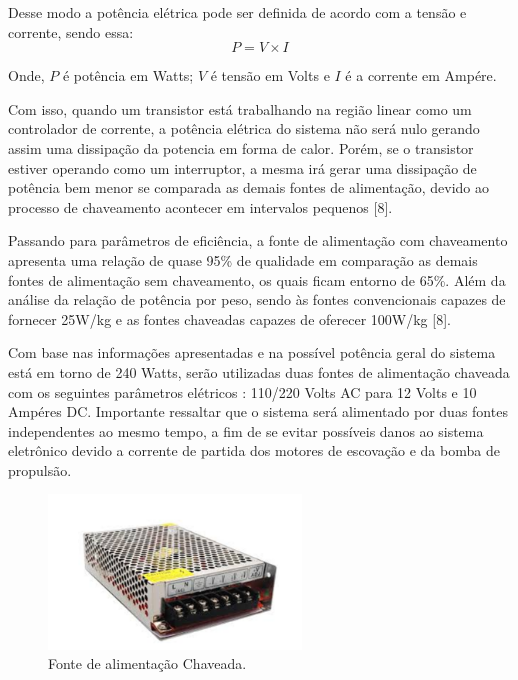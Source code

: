 Desse modo a potência elétrica pode ser definida de acordo com a tensão e corrente, sendo essa:
\begin{displaymath}
  P = V \times I
\end{displaymath}

Onde, $P$ é potência em Watts; $V$ é tensão em Volts e $I$ é a corrente em Ampére.

Com isso, quando um transistor está trabalhando na região linear como um controlador de corrente, a potência elétrica do sistema não será nulo gerando assim uma dissipação da potencia em forma de calor. Porém, se o transistor estiver operando como um interruptor, a mesma irá gerar uma dissipação de potência bem menor se comparada as demais fontes de alimentação, devido ao processo de chaveamento acontecer em intervalos pequenos [8].

Passando para parâmetros de eficiência, a fonte de alimentação com chaveamento apresenta uma relação de quase 95\% de qualidade em comparação as demais fontes de alimentação sem chaveamento, os quais ficam entorno de 65\%. Além da análise da relação de potência por peso, sendo às fontes convencionais capazes de fornecer 25W/kg e as fontes chaveadas capazes de oferecer 100W/kg [8].

Com base nas informações apresentadas e na possível potência geral do sistema está em torno de 240 Watts, serão utilizadas duas fontes de alimentação chaveada com os seguintes parâmetros elétricos : 110/220 Volts AC para 12 Volts e 10 Ampéres DC. Importante ressaltar que o sistema será alimentado por duas fontes independentes ao mesmo tempo, a fim de se evitar possíveis danos ao sistema eletrônico devido a corrente de partida dos motores de escovação e da bomba de propulsão.
\par
\begin{figure}[h]
  \centering
  \includegraphics[width=0.6\textwidth]{figures/power-supply.png}
  \caption{Fonte de alimentação Chaveada. }
  \label{fig:power-supply}
\end{figure}
\FloatBarrier
\par

